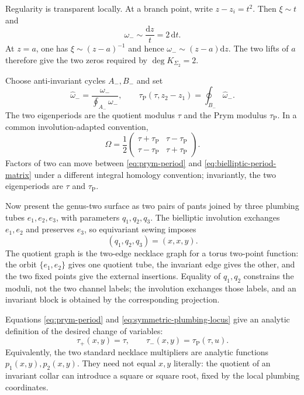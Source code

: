 \documentclass[11pt]{article}
\newcommand{\dd}{\mathrm d}
\begin{document}
Regularity is transparent locally.  At a branch point, write
$z-z_i=t^2$.  Then $\xi\sim t$ and
\begin{equation}
 \omega_-\sim\frac{\dd z}{t}=2\,\dd t.
\end{equation}
At $z=a$, one has $\xi\sim(z-a)^{-1}$ and hence
$\omega_-\sim(z-a)\dd z$.  The two lifts of $a$ therefore give the two
zeros required by $\deg K_{\Sigma_2}=2$.

Choose anti-invariant cycles $A_-,B_-$ and set
\begin{equation}
 \widehat\omega_-=
 \frac{\omega_-}{\oint_{A_-}\omega_-},
 \qquad
 \tau_{\mathrm P}(\tau,z_2-z_1)
 =\oint_{B_-}\widehat\omega_- .
 \label{eq:prym-period}
\end{equation}
The two eigenperiods are the quotient modulus $\tau$ and the Prym modulus
$\tau_{\mathrm P}$.  In a common involution-adapted convention,
\begin{equation}
 \Omega=\frac12
 \begin{pmatrix}
  \tau+\tau_{\mathrm P}&\tau-\tau_{\mathrm P}\\
  \tau-\tau_{\mathrm P}&\tau+\tau_{\mathrm P}
 \end{pmatrix}.
 \label{eq:bielliptic-period-matrix}
\end{equation}
Factors of two can move between \eqref{eq:prym-period} and
\eqref{eq:bielliptic-period-matrix} under a different integral homology
convention; invariantly, the two eigenperiods are $\tau$ and
$\tau_{\mathrm P}$.

Now present the genus-two surface as two pairs of pants joined by three
plumbing tubes $e_1,e_2,e_3$, with parameters $q_1,q_2,q_3$.  The
bielliptic involution exchanges $e_1,e_2$ and preserves $e_3$, so equivariant
sewing imposes
\begin{equation}
 \boxed{(q_1,q_2,q_3)=(x,x,y).}
 \label{eq:symmetric-plumbing-locus}
\end{equation}
The quotient graph is the two-edge necklace graph for a torus two-point
function: the orbit $\{e_1,e_2\}$ gives one quotient tube, the invariant
edge gives the other, and the two fixed points give the external insertions.
Equality of $q_1,q_2$ constrains the moduli, not the two channel labels; the
involution exchanges those labels, and an invariant block is obtained by
the corresponding projection.

Equations \eqref{eq:prym-period} and \eqref{eq:symmetric-plumbing-locus}
give an analytic definition of the desired change of variables:
\begin{equation}
 \tau_+(x,y)=\tau,
 \qquad
 \tau_-(x,y)=\tau_{\mathrm P}(\tau,u).
 \label{eq:period-matching-map}
\end{equation}
Equivalently, the two standard necklace multipliers are analytic functions
$p_1(x,y),p_2(x,y)$.  They need not equal $x,y$ literally: the quotient of
an invariant collar can introduce a square or square root, fixed by the
local plumbing coordinates.
\end{document}
